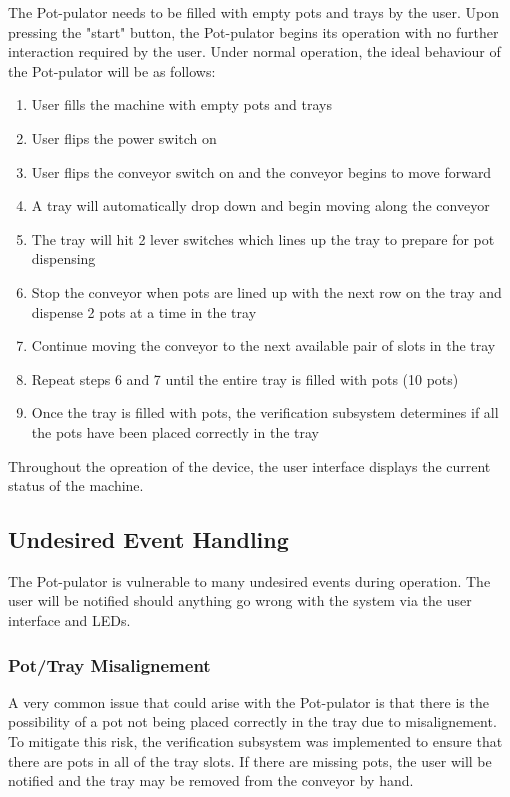 \documentclass[12pt, titlepage]{article}
\begin{document}
The Pot-pulator needs to be filled with empty pots and trays by the user. Upon pressing the "start" button,
the Pot-pulator begins its operation with no further interaction required by the user.
Under normal operation, the ideal behaviour of the Pot-pulator will be as follows:
\begin{enumerate}
  \item User fills the machine with empty pots and trays
  \item User flips the power switch on
  \item User flips the conveyor switch on and the conveyor begins to move forward
  \item A tray will automatically drop down and begin moving along the conveyor
  \item The tray will hit 2 lever switches which lines up the tray to prepare for pot dispensing
  \item Stop the conveyor when pots are lined up with the next row on the tray and dispense 2 pots at a time in the tray
  \item Continue moving the conveyor to the next available pair of slots in the tray
  \item Repeat steps 6 and 7 until the entire tray is filled with pots (10 pots)
  \item Once the tray is filled with pots, the verification subsystem determines if all the pots have been placed correctly in the tray
\end{enumerate}

\noindent Throughout the opreation of the device, the user interface displays the current status of the machine.

\subsection{Undesired Event Handling}
The Pot-pulator is vulnerable to many undesired events during operation. The user will be notified should anything
go wrong with the system via the user interface and LEDs.
\subsubsection{Pot/Tray Misalignement}
A very common issue that could arise with the Pot-pulator is that there is the possibility
of a pot not being placed correctly in the tray due to misalignement. To mitigate this risk,
the verification subsystem was implemented to ensure that there are pots in all of the tray slots.
If there are missing pots, the user will be notified and the tray may be removed from the conveyor by hand.
\end{document}
